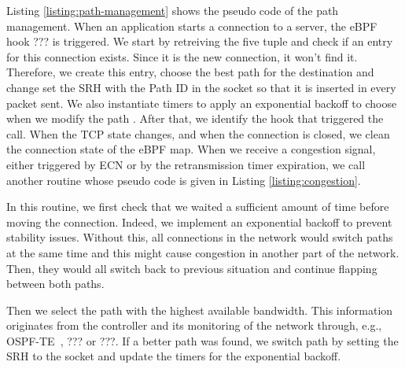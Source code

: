 


Listing \ref{listing:path-management} shows the pseudo code of the path management.
When an application starts a connection to a server, the eBPF hook ??? is triggered.
We start by retreiving the five tuple and check if an entry for this connection exists.
Since it is the new connection, it won't find it. Therefore, we create this entry,
choose the best path for the destination and change set the SRH with the Path ID
in the socket so that it is inserted in every packet sent.
We also instantiate timers to apply an exponential backoff to choose when we modify the path
.
After that, we identify the hook that triggered the call. When the TCP state changes, and
when the connection is closed, we clean the connection state of the eBPF map. When we receive
a congestion signal, either triggered by ECN or by the retransmission timer expiration,
we call another routine whose pseudo code is given in Listing \ref{listing:congestion}.

In this routine, we first check that we waited a sufficient amount of time before moving the connection.
Indeed, we implement an exponential backoff to prevent stability issues. Without this, all connections in the network
would switch paths at the same time and this might cause congestion in another part of the network.
Then, they would all switch back to previous situation and continue flapping between both paths.

Then we select the path with the highest available bandwidth. This information originates from the controller
and its monitoring of the network through, e.g., OSPF-TE~\cite{ospfte}, ??? or ???.
If a better path was found, we switch path by setting the SRH to the socket and update the timers
for the exponential backoff.






